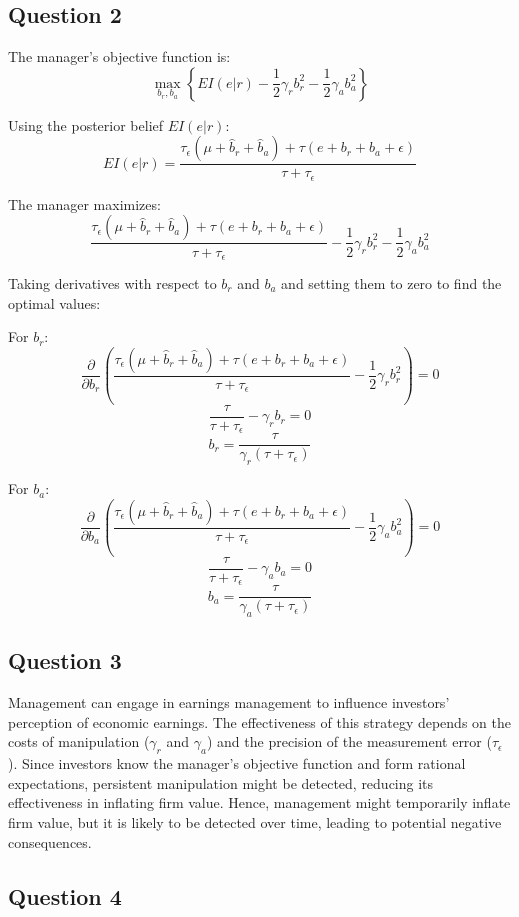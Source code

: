 \documentclass{article}
\begin{document}
\subsection*{Question 2}

The manager’s objective function is:
\[
\max_{b_r, b_a} \left\{ EI(e|r) - \frac{1}{2} \gamma_r b_r^2 - \frac{1}{2} \gamma_a b_a^2 \right\}
\]

Using the posterior belief \( EI(e|r) \):
\[
EI(e|r) = \frac{\tau_\epsilon (\mu + \hat{b}_r + \hat{b}_a) + \tau (e + b_r + b_a + \epsilon)}{\tau + \tau_\epsilon}
\]

The manager maximizes:
\[
\frac{\tau_\epsilon (\mu + \hat{b}_r + \hat{b}_a) + \tau (e + b_r + b_a + \epsilon)}{\tau + \tau_\epsilon} - \frac{1}{2} \gamma_r b_r^2 - \frac{1}{2} \gamma_a b_a^2
\]

Taking derivatives with respect to \( b_r \) and \( b_a \) and setting them to zero to find the optimal values:

For \( b_r \):
\[
\frac{\partial}{\partial b_r} \left( \frac{\tau_\epsilon (\mu + \hat{b}_r + \hat{b}_a) + \tau (e + b_r + b_a + \epsilon)}{\tau + \tau_\epsilon} - \frac{1}{2} \gamma_r b_r^2 \right) = 0
\]
\[
\frac{\tau}{\tau + \tau_\epsilon} - \gamma_r b_r = 0
\]
\[
b_r = \frac{\tau}{\gamma_r (\tau + \tau_\epsilon)}
\]

For \( b_a \):
\[
\frac{\partial}{\partial b_a} \left( \frac{\tau_\epsilon (\mu + \hat{b}_r + \hat{b}_a) + \tau (e + b_r + b_a + \epsilon)}{\tau + \tau_\epsilon} - \frac{1}{2} \gamma_a b_a^2 \right) = 0
\]
\[
\frac{\tau}{\tau + \tau_\epsilon} - \gamma_a b_a = 0
\]
\[
b_a = \frac{\tau}{\gamma_a (\tau + \tau_\epsilon)}
\]

\subsection*{Question 3}

Management can engage in earnings management to influence investors' perception of economic earnings. The effectiveness of this strategy depends on the costs of manipulation (\( \gamma_r \) and \( \gamma_a \)) and the precision of the measurement error (\( \tau_\epsilon \)). Since investors know the manager’s objective function and form rational expectations, persistent manipulation might be detected, reducing its effectiveness in inflating firm value. Hence, management might temporarily inflate firm value, but it is likely to be detected over time, leading to potential negative consequences.

\subsection*{Question 4}
\end{document}
